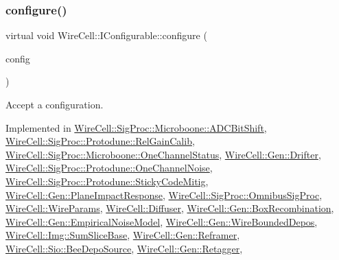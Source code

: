 \subsubsection{\texorpdfstring{configure()}{configure()}}
{\footnotesize\ttfamily virtual void Wire\+Cell\+::\+I\+Configurable\+::configure (\begin{DoxyParamCaption}\item[{const \hyperlink{namespace_wire_cell_a9f705541fc1d46c608b3d32c182333ee}{Wire\+Cell\+::\+Configuration} \&}]{config }\end{DoxyParamCaption})\hspace{0.3cm}{\ttfamily [pure virtual]}}



Accept a configuration. 



Implemented in \hyperlink{class_wire_cell_1_1_sig_proc_1_1_microboone_1_1_a_d_c_bit_shift_a9f38ca7b73b7a24d7ee38c6e90481fde}{Wire\+Cell\+::\+Sig\+Proc\+::\+Microboone\+::\+A\+D\+C\+Bit\+Shift}, \hyperlink{class_wire_cell_1_1_sig_proc_1_1_protodune_1_1_rel_gain_calib_a99b012e241dee5e126200eec679c80b0}{Wire\+Cell\+::\+Sig\+Proc\+::\+Protodune\+::\+Rel\+Gain\+Calib}, \hyperlink{class_wire_cell_1_1_sig_proc_1_1_microboone_1_1_one_channel_status_ab1ff00e5fcfd1665621ef0a81b30f463}{Wire\+Cell\+::\+Sig\+Proc\+::\+Microboone\+::\+One\+Channel\+Status}, \hyperlink{class_wire_cell_1_1_gen_1_1_drifter_a3a4689030cd1223426682fefc0e85b35}{Wire\+Cell\+::\+Gen\+::\+Drifter}, \hyperlink{class_wire_cell_1_1_sig_proc_1_1_protodune_1_1_one_channel_noise_acf32ea2e00ad1f3e39e987aa30ca60c3}{Wire\+Cell\+::\+Sig\+Proc\+::\+Protodune\+::\+One\+Channel\+Noise}, \hyperlink{class_wire_cell_1_1_sig_proc_1_1_protodune_1_1_sticky_code_mitig_a26422e4f93a396fa3e72809377ed4567}{Wire\+Cell\+::\+Sig\+Proc\+::\+Protodune\+::\+Sticky\+Code\+Mitig}, \hyperlink{class_wire_cell_1_1_gen_1_1_plane_impact_response_a5ab969666fea20210311a3751db47db0}{Wire\+Cell\+::\+Gen\+::\+Plane\+Impact\+Response}, \hyperlink{class_wire_cell_1_1_sig_proc_1_1_omnibus_sig_proc_ae275bf0ab16567d97df2cfcef76e1bdc}{Wire\+Cell\+::\+Sig\+Proc\+::\+Omnibus\+Sig\+Proc}, \hyperlink{class_wire_cell_1_1_wire_params_a8d20db605558e5fa6afaa7c5cf53ae4f}{Wire\+Cell\+::\+Wire\+Params}, \hyperlink{class_wire_cell_1_1_diffuser_a494d8aa964610d4b129f4305630491f6}{Wire\+Cell\+::\+Diffuser}, \hyperlink{class_wire_cell_1_1_gen_1_1_box_recombination_af81aaca6ddde2aecdc3ee3d050611473}{Wire\+Cell\+::\+Gen\+::\+Box\+Recombination}, \hyperlink{class_wire_cell_1_1_gen_1_1_empirical_noise_model_aa38f65fc1f32c8017f8205b32850074e}{Wire\+Cell\+::\+Gen\+::\+Empirical\+Noise\+Model}, \hyperlink{class_wire_cell_1_1_gen_1_1_wire_bounded_depos_a8a5d8c2f944879a83ae1bd663c615e03}{Wire\+Cell\+::\+Gen\+::\+Wire\+Bounded\+Depos}, \hyperlink{class_wire_cell_1_1_img_1_1_sum_slice_base_adcf3268fc426d4158c87d091370f93df}{Wire\+Cell\+::\+Img\+::\+Sum\+Slice\+Base}, \hyperlink{class_wire_cell_1_1_gen_1_1_reframer_a805ac9a1be8a7b23c2ac5dc6334aea7f}{Wire\+Cell\+::\+Gen\+::\+Reframer}, \hyperlink{class_wire_cell_1_1_sio_1_1_bee_depo_source_a3c1f29938d5d3c0a5622f78ee777bb02}{Wire\+Cell\+::\+Sio\+::\+Bee\+Depo\+Source}, \hyperlink{class_wire_cell_1_1_gen_1_1_retagger_a8c198fcdc40f6254b5a33475f6a8e5bc}{Wire\+Cell\+::\+Gen\+::\+Retagger}, 